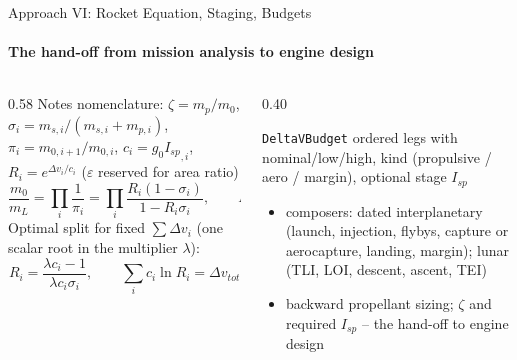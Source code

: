 \documentclass[aspectratio=169,10pt]{beamer}
\newcommand{\Isp}{{I_{sp}}}\newcommand{\dv}{\Delta v}\newcommand{\vinf}{v_\infty}\newcommand{\gz}{g_0}\newcommand{\dd}{\mathrm{d}}
\newcommand{\code}[1]{\texttt{#1}}
\begin{document}
\begin{frame}{Approach VI: Rocket Equation, Staging, Budgets}
  \framesubtitle{The hand-off from mission analysis to engine design}
\small
\begin{columns}[T]
\begin{column}{0.58\textwidth}
Notes nomenclature: $\zeta=m_p/m_0$, $\sigma_i=m_{s,i}/(m_{s,i}+m_{p,i})$, $\pi_i=m_{0,i+1}/m_{0,i}$, $c_i=\gz\Isp_{,i}$, $R_i=e^{\dv_i/c_i}$ \; ($\varepsilon$ reserved for area ratio)
\[
\frac{m_0}{m_L}=\prod_i\frac{1}{\pi_i}=\prod_i\frac{R_i(1-\sigma_i)}{1-R_i\sigma_i},\qquad
\Isp^{req}=\frac{\dv}{\gz\,\ln[1/(1-\zeta)]}
\]
Optimal split for fixed $\sum\dv_i$ (one scalar root in the multiplier $\lambda$):
\[
R_i=\frac{\lambda c_i-1}{\lambda c_i\sigma_i},\qquad \sum_i c_i\ln R_i=\dv_{tot}
\]
\end{column}
\begin{column}{0.40\textwidth}
\begin{block}{\code{DeltaVBudget}}
ordered legs with nominal/low/high, kind (propulsive / aero / margin), optional stage $I_{sp}$
\begin{itemize}
\item composers: dated interplanetary (launch, injection, flybys, capture or aerocapture, landing, margin); lunar (TLI, LOI, descent, ascent, TEI)
\item backward propellant sizing; $\zeta$ and required $I_{sp}$ -- the hand-off to engine design
\end{itemize}
\end{block}
\end{column}
\end{columns}
\end{frame}

\end{document}
